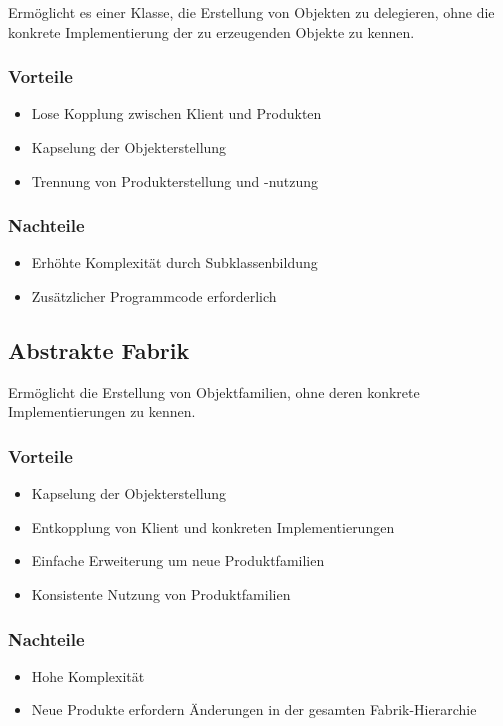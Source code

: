 \documentclass[11pt, a4paper]{article}
\begin{document}
Ermöglicht es einer Klasse, die Erstellung von Objekten zu delegieren, ohne die konkrete Implementierung der zu erzeugenden Objekte zu kennen.

\subsubsection*{Vorteile}
\begin{itemize}
    \item Lose Kopplung zwischen Klient und Produkten
    \item Kapselung der Objekterstellung
    \item Trennung von Produkterstellung und -nutzung
\end{itemize}

\subsubsection*{Nachteile}
\begin{itemize}
    \item Erhöhte Komplexität durch Subklassenbildung
    \item Zusätzlicher Programmcode erforderlich
\end{itemize}

\subsection{Abstrakte Fabrik}

Ermöglicht die Erstellung von Objektfamilien, ohne deren konkrete Implementierungen zu kennen.

\subsubsection*{Vorteile}
\begin{itemize}
    \item Kapselung der Objekterstellung
    \item Entkopplung von Klient und konkreten Implementierungen
    \item Einfache Erweiterung um neue Produktfamilien
    \item Konsistente Nutzung von Produktfamilien
\end{itemize}

\subsubsection*{Nachteile}
\begin{itemize}
    \item Hohe Komplexität
    \item Neue Produkte erfordern Änderungen in der gesamten Fabrik-Hierarchie
\end{itemize}
\end{document}
